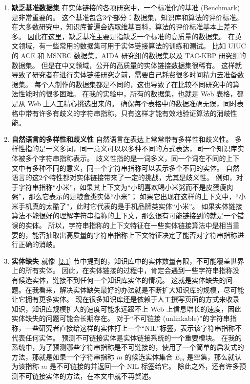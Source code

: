 \begin{enumerate}[1.]
\item \textbf{缺乏基准数据集} \newline
在实体链接的各项研究中，一个标准化的基准 (Benchmark) 是非常重要的。
这个基准包含3个部分：数据集，知识库和算法的评价标准。
在大多数研究中，知识库普遍会选取维基百科，算法的评价标准基本上差不多。
因此在这里，缺乏基准主要是指缺乏一个标准的高质量的数据集。
在英文领域，有一些常用的数据集可用于实体链接算法的训练和测试。
比如 UIUC 的 ACE 和 MSNBC 数据集，AIDA 研究组的数据集以及 TAC-KBP 研究组的数据集。
但是在中文领域，公开的高质量的实体链接数据集很稀有。
这样就导致了研究者在进行实体链接研究之前，需要自己耗费很多时间精力去准备数据集。
每个人制作的数据集都是不同的，这也导致了在比较不同研究中的算法性能时的很多困难。
在我的实验中，所有的数据集，也就是 Web 表格，都是从 Web 上人工精心挑选出来的。
确保每个表格中的数据准确无误，同时表格中带有许多有歧义的字符串指称，只有这样才能有效地验证算法的消岐性能。

\item \textbf{自然语言的多样性和歧义性} \newline
自然语言在表达上常常带有多样性和歧义性。
多样性指的是一义多词，同一意义可以以多种不同的方式表达，同一个知识库实体被多个字符串指称表示。
歧义性指的是一词多义，同一个词在不同的上下文中有多种不同的意义，同一个字符串指称可以表示多个不同的实体。
自然语言的这2个特性都对实体链接带来了一定的挑战，尤其是歧义性。
例如，对于字符串指称``小米''，如果其上下文为``小明喜欢喝小米粥而不是皮蛋瘦肉粥''，那么它表示的是粮食类实体``小米''；
如果它出现在这样的上下文中，``小米手机真的太酷了''，此时它代表的是手机品牌类实体``小米''。
如果实体链接算法不能很好的理解字符串指称的上下文，那么很有可能链接到的就是一个错误的实体。
所以，字符串指称的上下文特征在一些实体链接算法中是相当重要的，能否抽取出高质量的字符串指称上下文特征决定了能否对字符串指称进行正确的消岐。

\item \textbf{实体缺失} \newline
就像~\ref{2.1} 节中提到的，知识库中的实体数量有限，不可能覆盖世界上的所有实体。
因此，在实体链接的过程中，肯定会遇到一些字符串指称没有候选实体，链接不到任何一个知识库实体的情况。
这就是实体缺失的问题。在我看来，解决实体缺失最好的办法就是不断扩大知识库的规模，尽可能让它拥有更多实体。
现在很多知识库还是依赖于人工撰写页面的方式来收录知识，知识库规模扩大的速度可能永远跟不上 Web 上信息增长的速度，因此实体缺失的问题可能会长期存在。
对于``不可链接 (unlinkable)''的字符串指称，一些研究者\cite{zhang2013zhishilink}\cite{dredze2010entity}直接给这样的实体打上一个``NIL''标签，表示该字符串指称不代表任何实体。
预测不可链接实体是实体链接系统的一个重要模块。
在我的系统中，为了预测哪些字符串指称是不可链接的，使用了一个简单的启发式的方法，那就是如果一个字符串指称 $m$ 的候选实体集合 $E_m$ 是空集，那么就认为该指称 $m$ 是不可链接的并返回一个 NIL 标签给它。
除此之外，还有许多预测不可链接实体的方法，在本文中就不再赘述。


\end{enumerate}


